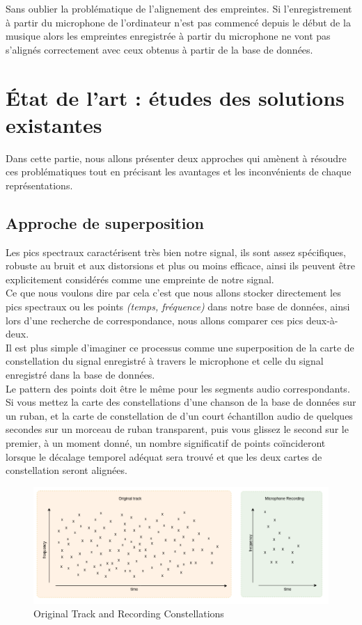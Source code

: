 \documentclass[11pt, report, french]{scrreprt}
\begin{document}
Sans oublier la problématique de l'alignement des empreintes. Si l'enregistrement à partir du microphone de l'ordinateur n'est pas commencé depuis le début de la musique alors les empreintes enregistrée à partir du microphone ne vont pas s'alignés correctement avec ceux obtenus à partir de la base de données.\\

\section{État de l’art : études des solutions existantes}
Dans cette partie, nous allons présenter deux approches qui amènent à résoudre ces problématiques tout en précisant les avantages et les inconvénients de chaque représentations.\\\par

\subsection{Approche de superposition}
Les pics spectraux caractérisent très bien notre signal, ils sont assez spécifiques, robuste au bruit et aux distorsions et plus ou moins efficace, ainsi ils peuvent être explicitement considérés comme une empreinte de notre signal.\\

Ce que nous voulons dire par cela c'est que nous allons stocker directement les pics spectraux ou les points \textit{(temps, fréquence)} dans notre base de données, ainsi lors d'une recherche de correspondance, nous allons comparer ces pics deux-à-deux.\\

Il est plus simple d'imaginer ce processus comme une superposition de la carte de constellation du signal enregistré à travers le microphone et celle du signal enregistré dans la base de données.\\
Le pattern des points doit être le même pour les segments audio correspondants. Si vous mettez la carte des constellations d'une
chanson de la base de données sur un ruban, et la carte de constellation de d'un court échantillon audio de quelques secondes sur un morceau de ruban transparent, puis vous glissez le second sur le premier, à un moment donné, un nombre significatif de points coïncideront lorsque le décalage temporel adéquat sera trouvé et que les deux cartes de constellation seront alignées.\\

\begin{figure}[H]
	\centering
	\includegraphics[scale=0.52]{img/superposition.png}
	\caption{Original Track and Recording Constellations}
\end{figure}
\end{document}
